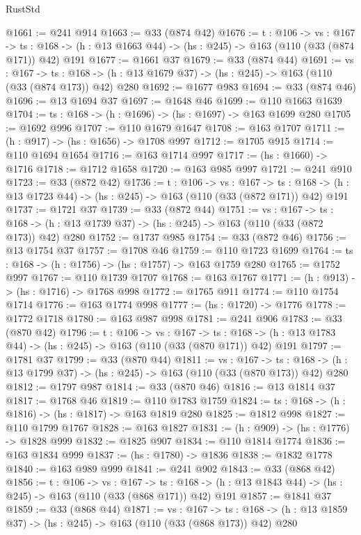 \begin{lexlean}{RustStd}
\begin{coremodule}
{\begin{coremodule}
{{{{{@1661 := @241 @914
@1663 := @33 (@874 @42)
@1676 := {t : @106} ->
  {vs : @167} ->
  {ts : @168} -> (h : @13 @1663 @44) -> (hs : @245) -> @163 (@110 (@33 (@874 @171)) @42) @191
@1677 := @1661 @37
@1679 := @33 (@874 @44)
@1691 := {vs : @167} ->
  {ts : @168} -> (h : @13 @1679 @37) -> (hs : @245) -> @163 (@110 (@33 (@874 @173)) @42) @280
@1692 := @1677 @983
@1694 := @33 (@874 @46)
@1696 := @13 @1694 @37
@1697 := @1648 @46
@1699 := @110 @1663 @1639
@1704 := {ts : @168} -> (h : @1696) -> (hs : @1697) -> @163 @1699 @280
@1705 := @1692 @996
@1707 := @110 @1679 @1647
@1708 := @163 @1707
@1711 := (h : @917) -> (hs : @1656) -> @1708 @997
@1712 := @1705 @915
@1714 := @110 @1694 @1654
@1716 := @163 @1714 @997
@1717 := (hs : @1660) -> @1716
@1718 := @1712 @1658
@1720 := @163 @985 @997
@1721 := @241 @910
@1723 := @33 (@872 @42)
@1736 := {t : @106} ->
  {vs : @167} ->
  {ts : @168} -> (h : @13 @1723 @44) -> (hs : @245) -> @163 (@110 (@33 (@872 @171)) @42) @191
@1737 := @1721 @37
@1739 := @33 (@872 @44)
@1751 := {vs : @167} ->
  {ts : @168} -> (h : @13 @1739 @37) -> (hs : @245) -> @163 (@110 (@33 (@872 @173)) @42) @280
@1752 := @1737 @985
@1754 := @33 (@872 @46)
@1756 := @13 @1754 @37
@1757 := @1708 @46
@1759 := @110 @1723 @1699
@1764 := {ts : @168} -> (h : @1756) -> (hs : @1757) -> @163 @1759 @280
@1765 := @1752 @997
@1767 := @110 @1739 @1707
@1768 := @163 @1767
@1771 := (h : @913) -> (hs : @1716) -> @1768 @998
@1772 := @1765 @911
@1774 := @110 @1754 @1714
@1776 := @163 @1774 @998
@1777 := (hs : @1720) -> @1776
@1778 := @1772 @1718
@1780 := @163 @987 @998
@1781 := @241 @906
@1783 := @33 (@870 @42)
@1796 := {t : @106} ->
  {vs : @167} ->
  {ts : @168} -> (h : @13 @1783 @44) -> (hs : @245) -> @163 (@110 (@33 (@870 @171)) @42) @191
@1797 := @1781 @37
@1799 := @33 (@870 @44)
@1811 := {vs : @167} ->
  {ts : @168} -> (h : @13 @1799 @37) -> (hs : @245) -> @163 (@110 (@33 (@870 @173)) @42) @280
@1812 := @1797 @987
@1814 := @33 (@870 @46)
@1816 := @13 @1814 @37
@1817 := @1768 @46
@1819 := @110 @1783 @1759
@1824 := {ts : @168} -> (h : @1816) -> (hs : @1817) -> @163 @1819 @280
@1825 := @1812 @998
@1827 := @110 @1799 @1767
@1828 := @163 @1827
@1831 := (h : @909) -> (hs : @1776) -> @1828 @999
@1832 := @1825 @907
@1834 := @110 @1814 @1774
@1836 := @163 @1834 @999
@1837 := (hs : @1780) -> @1836
@1838 := @1832 @1778
@1840 := @163 @989 @999
@1841 := @241 @902
@1843 := @33 (@868 @42)
@1856 := {t : @106} ->
  {vs : @167} ->
  {ts : @168} -> (h : @13 @1843 @44) -> (hs : @245) -> @163 (@110 (@33 (@868 @171)) @42) @191
@1857 := @1841 @37
@1859 := @33 (@868 @44)
@1871 := {vs : @167} ->
  {ts : @168} -> (h : @13 @1859 @37) -> (hs : @245) -> @163 (@110 (@33 (@868 @173)) @42) @280
}}}}}
\end{coremodule}}
\end{coremodule}
\end{lexlean}
